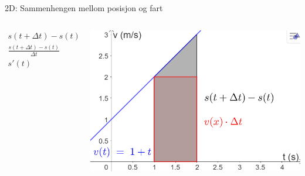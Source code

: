 \greenheader
\begin{frame}{2D: Sammenhengen mellom posisjon og fart}
\begin{columns}[T,onlytextwidth]
   \begin{column}{0.45\textwidth}
    \begin{align*}
      s(t+\Delta t)-s(t) &\approx v(t)\,\Delta t\\[0.8em]
      \frac{s(t+\Delta t)-s(t)}{\Delta t} &\approx v(t)\\[0.8em]
      s'(t) &\approx v(t)
    \end{align*}
  \end{column}
   \begin{column}{0.55\textwidth}
    \centering
    \includegraphics[width=\linewidth]{R2-K2A-5.png}
  \end{column}
\end{columns}
\end{frame}

